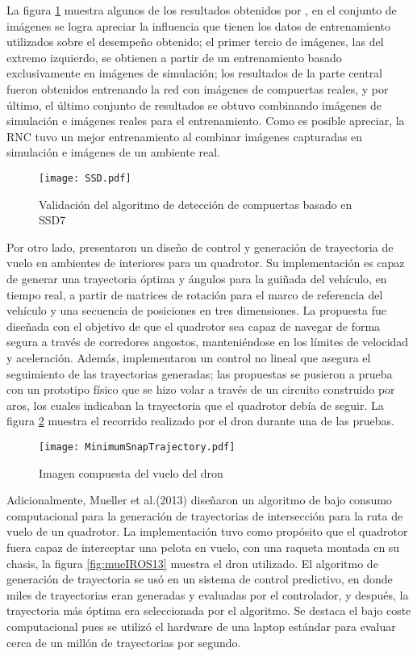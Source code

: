 La figura \ref{fig:SSD} muestra algunos de los resultados obtenidos por \citet{cabrera2019gate}, en el conjunto de imágenes se logra apreciar la influencia que tienen los datos de entrenamiento utilizados sobre el desempeño obtenido; el primer tercio de imágenes, las del extremo izquierdo, se obtienen a partir de un entrenamiento basado exclusivamente en imágenes de simulación; los resultados de la parte central fueron obtenidos entrenando la red con imágenes de compuertas reales, y por último, el último conjunto de resultados se obtuvo combinando imágenes de simulación e imágenes reales para el entrenamiento. Como es posible apreciar, la RNC tuvo un mejor entrenamiento al combinar imágenes capturadas en simulación e imágenes de un ambiente real.

\begin{figure}[ht]
    \centering
    \texttt{[image: SSD.pdf]}
    \caption{Validación del algoritmo de detección de compuertas basado en SSD7 \citet{cabrera2019gate}}
    \label{fig:SSD}
\end{figure}

Por otro lado, \citet{mellinger2011minimum} presentaron un diseño de control y generación de trayectoria de vuelo en ambientes de interiores para un quadrotor. Su implementación es capaz de generar una trayectoria óptima y ángulos para la guiñada del vehículo, en tiempo real, a partir de matrices de rotación para el marco de referencia del vehículo y una secuencia de posiciones en tres dimensiones. La propuesta fue diseñada con el objetivo de que el quadrotor sea capaz de navegar de forma segura a través de corredores angostos, manteniéndose en los límites de velocidad y aceleración. Además, implementaron un control no lineal que asegura el seguimiento de las trayectorias generadas; las propuestas se pusieron a prueba con un prototipo físico  que se hizo volar a través de un circuito construido por aros, los cuales indicaban la trayectoria que el quadrotor debía de seguir. La figura \ref{fig:MinimumSnapTrajectory} muestra el recorrido realizado por el dron durante una de las pruebas.

\begin{figure}[ht]
    \centering
    \texttt{[image: MinimumSnapTrajectory.pdf]}
    \caption{Imagen compuesta del vuelo del dron \citet{mellinger2011minimum}}
    \label{fig:MinimumSnapTrajectory}
\end{figure}

Adicionalmente, Mueller et al.(2013)\citet{mueller2013computationally} diseñaron un algoritmo de bajo consumo computacional para la generación de trayectorias de intersección para la ruta de vuelo de un quadrotor. La implementación tuvo como propósito que el quadrotor fuera capaz de interceptar una pelota en vuelo, con una raqueta montada en su chasis, la figura \ref{fig:mueIROS13} muestra el dron utilizado. El algoritmo de generación de trayectoria se usó en un sistema de control predictivo, en donde miles de trayectorias eran generadas y evaluadas por el controlador, y después, la trayectoria más óptima era seleccionada por el algoritmo.  Se destaca el bajo coste computacional pues se utilizó el hardware de una laptop estándar para evaluar cerca de un millón de trayectorias por segundo.

